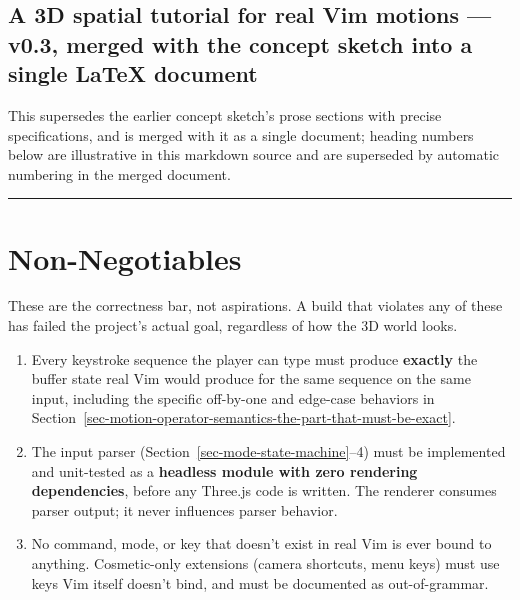 \documentclass[11pt]{article}
\providecommand{\tightlist}{%
  \setlength{\itemsep}{0pt}\setlength{\parskip}{0pt}}
\begin{document}
\hypertarget{a-3d-spatial-tutorial-for-real-vim-motions-v0.3-merged-with-the-concept-sketch-into-a-single-latex-document}{%
\subsection{A 3D spatial tutorial for real Vim motions --- v0.3, merged with the concept sketch into a single LaTeX document}\label{a-3d-spatial-tutorial-for-real-vim-motions-v0.3-merged-with-the-concept-sketch-into-a-single-latex-document}}

This supersedes the earlier concept sketch's prose sections with precise
specifications, and is merged with it as a single document; heading numbers
below are illustrative in this markdown source and are superseded by
automatic numbering in the merged document.

\begin{center}\rule{0.5\linewidth}{0.5pt}\end{center}

\hypertarget{sec-non-negotiables}{%
\section{Non-Negotiables}\label{sec-non-negotiables}}

These are the correctness bar, not aspirations. A build that violates any of
these has failed the project's actual goal, regardless of how the 3D world
looks.

\begin{enumerate}
\def\labelenumi{\arabic{enumi}.}
\tightlist
\item
  Every keystroke sequence the player can type must produce \textbf{exactly} the
  buffer state real Vim would produce for the same sequence on the same
  input, including the specific off-by-one and edge-case behaviors in
  Section~\ref{sec-motion-operator-semantics-the-part-that-must-be-exact}.
\item
  The input parser (Section~\ref{sec-mode-state-machine}--4) must be implemented and unit-tested as a
  \textbf{headless module with zero rendering dependencies}, before any Three.js
  code is written. The renderer consumes parser output; it never influences
  parser behavior.
\item
  No command, mode, or key that doesn't exist in real Vim is ever bound to
  anything. Cosmetic-only extensions (camera shortcuts, menu keys) must use
  keys Vim itself doesn't bind, and must be documented as out-of-grammar.
\end{enumerate}
\end{document}
